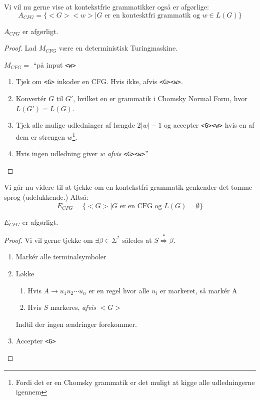 Vi vil nu gerne vise at kontekstfrie grammatikker også er afgørlige:
\begin{equation*}
	A_{CFG} = \{<G><w> \mid G \text{ er en kontesktfri grammatik og }w \in L(G)\}
\end{equation*}

\begin{theorem}
	$A_{CFG}$ er afgørligt.
\end{theorem}

\begin{proof}
	Lad $M_{CFG}$ være en deterministisk Turingmaskine.

	$M_{CFG} = $ ``på input \texttt{<w>}
	\begin{enumerate}
		\item Tjek om \texttt{<G>} inkoder en CFG. Hvis ikke, afvis \texttt{<G><w>}.
		\item Konvertér $G$ til $G'$, hvilket en er grammatik i Chomsky Normal Form, hvor $L(G') = L(G)$.
		\item Tjek alle mulige udledninger af længde $2|w| -1$ og accepter \texttt{<G><w>} hvis en af dem er strengen $w$\footnote{Fordi det er en Chomsky grammatik er det muligt at kigge alle udledningerne igennem}.
		\item Hvis ingen udledning giver $w$ \textit{afvis} \texttt{<G><w>}''
	\end{enumerate}
\end{proof}

Vi går nu videre til at tjekke om en kontekstfri grammatik genkender det tomme sprog (udelukkende.) Altså:
\begin{equation*}
	E_{CFG} = \{<G> \mid G \text{ er en CFG og }L(G) = \emptyset\}
\end{equation*}

\begin{theorem}
	$E_{CFG}$ er afgørligt.
\end{theorem}

\begin{proof}
	Vi vil gerne tjekke om $\exists \beta \in \Sigma^{*}$ således at $S \stackrel{*}{\Rightarrow} \beta$.
	\begin{enumerate}
		\item Markér alle terminalsymboler
		\item Løkke
		      \begin{enumerate}
			      \item Hvis $A \rightarrow u_{1}u_{2} \cdots u_{n}$ er en regel hvor alle $u_i$ er markeret, så markér A
			      \item Hvis $S$ markeres, \textit{afvis} $<G>$
		      \end{enumerate}
		      Indtil der ingen ændringer forekommer.

		\item Accepter \texttt{<G>}
	\end{enumerate}
\end{proof}

